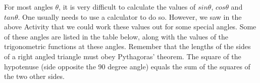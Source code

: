 \begin{enumerate}[noitemsep, label=\textbf{\arabic*}. ]
    \addtocounter{footnote}{-0}
    \label{m39408*id80598}\nopagebreak\noindent{}
    \end{enumerate}
        
      

      \label{m39408*id80673}For most angles \begin{math}\theta \end{math}, it is very difficult to calculate the values of \begin{math}sin\theta \end{math}, \begin{math}cos\theta \end{math} and \begin{math}tan\theta \end{math}. One usually needs to use a calculator to do so. However, we saw in the above Activity that we could work these values out for some special angles. Some of these angles are listed in the table below, along with the values of the trigonometric functions at these angles. Remember that the lengths of the sides of a right angled triangle must obey Pythagoras' theorem. The square of the hypotenuse (side opposite the 90 degree angle) equals the sum of the squares of the two other sides.\par 
      
